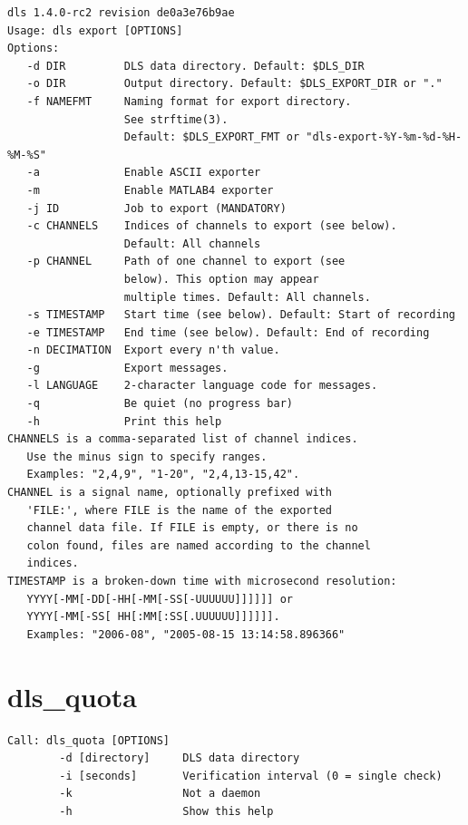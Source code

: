 \documentclass[a4paper,12pt,BCOR6mm,bibtotoc,idxtotoc]{scrbook}
\begin{document}
\begin{lstlisting}
dls 1.4.0-rc2 revision de0a3e76b9ae
Usage: dls export [OPTIONS]
Options:
   -d DIR         DLS data directory. Default: $DLS_DIR
   -o DIR         Output directory. Default: $DLS_EXPORT_DIR or "."
   -f NAMEFMT     Naming format for export directory.
                  See strftime(3).
                  Default: $DLS_EXPORT_FMT or "dls-export-%Y-%m-%d-%H-%M-%S"
   -a             Enable ASCII exporter
   -m             Enable MATLAB4 exporter
   -j ID          Job to export (MANDATORY)
   -c CHANNELS    Indices of channels to export (see below).
                  Default: All channels
   -p CHANNEL     Path of one channel to export (see
                  below). This option may appear
                  multiple times. Default: All channels.
   -s TIMESTAMP   Start time (see below). Default: Start of recording
   -e TIMESTAMP   End time (see below). Default: End of recording
   -n DECIMATION  Export every n'th value.
   -g             Export messages.
   -l LANGUAGE    2-character language code for messages.
   -q             Be quiet (no progress bar)
   -h             Print this help
CHANNELS is a comma-separated list of channel indices.
   Use the minus sign to specify ranges.
   Examples: "2,4,9", "1-20", "2,4,13-15,42".
CHANNEL is a signal name, optionally prefixed with
   'FILE:', where FILE is the name of the exported
   channel data file. If FILE is empty, or there is no
   colon found, files are named according to the channel
   indices.
TIMESTAMP is a broken-down time with microsecond resolution:
   YYYY[-MM[-DD[-HH[-MM[-SS[-UUUUUU]]]]]] or
   YYYY[-MM[-SS[ HH[:MM[:SS[.UUUUUU]]]]]].
   Examples: "2006-08", "2005-08-15 13:14:58.896366"
\end{lstlisting}


\section{dls\_quota}
\label{sec:apx_cmd_quota}

\begin{lstlisting}
Call: dls_quota [OPTIONS]
        -d [directory]     DLS data directory
        -i [seconds]       Verification interval (0 = single check)
        -k                 Not a daemon
        -h                 Show this help
\end{lstlisting}


\printindex

\listoffigures
\listoftables
\end{document}

